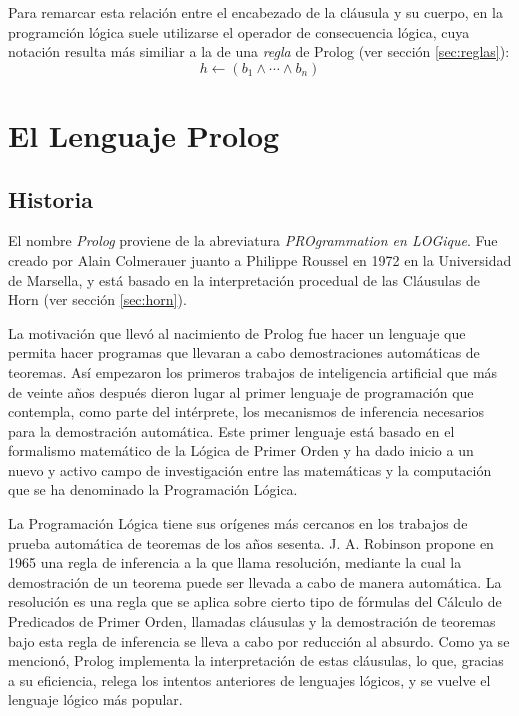 \documentclass[12pt,titlepage]{article}
\begin{document}
Para remarcar esta relación entre el encabezado de la cláusula y su cuerpo, en la programción lógica suele utilizarse el operador de consecuencia lógica, cuya notación resulta más similiar a la de una \emph{regla} de Prolog (ver sección \ref{sec:reglas}):
\begin{equation*} 
h \leftarrow (b_1 \land \cdots \land b_n)
\end{equation*}

\newpage
\section{El Lenguaje Prolog}

\subsection{Historia}

El nombre \textit{Prolog} proviene de la abreviatura \textit{PROgrammation en LOGique}. Fue creado por Alain Colmerauer juanto a Philippe Roussel en 1972 en la Universidad de Marsella, y está basado en la interpretación procedual de las Cláusulas de Horn (ver sección \ref{sec:horn}).

La motivación que llevó al nacimiento de Prolog fue hacer un lenguaje que permita hacer programas que llevaran a cabo demostraciones automáticas de teoremas. Así empezaron los primeros trabajos de inteligencia artificial que más de veinte años después dieron lugar al primer lenguaje de programación que contempla, como parte del intérprete, los mecanismos de inferencia necesarios para la demostración automática. Este primer lenguaje está basado en el formalismo matemático de la Lógica de Primer Orden y ha dado inicio a un nuevo y activo campo de investigación entre las matemáticas y la computación que se ha denominado la Programación Lógica.

La Programación Lógica tiene sus orígenes más cercanos en los trabajos de prueba automática de teoremas de los años sesenta. J. A. Robinson propone en 1965 una regla de inferencia a la que llama resolución, mediante la cual la demostración de un teorema puede ser llevada a cabo de manera automática. La resolución es una regla que se aplica sobre cierto tipo de fórmulas del Cálculo de Predicados de Primer Orden, llamadas cláusulas y la demostración de teoremas bajo esta regla de inferencia se lleva a cabo por reducción al absurdo. Como ya se mencionó, Prolog implementa la interpretación de estas cláusulas, lo que, gracias a su eficiencia, relega los intentos anteriores de lenguajes lógicos, y se vuelve el lenguaje lógico más popular.
\end{document}
